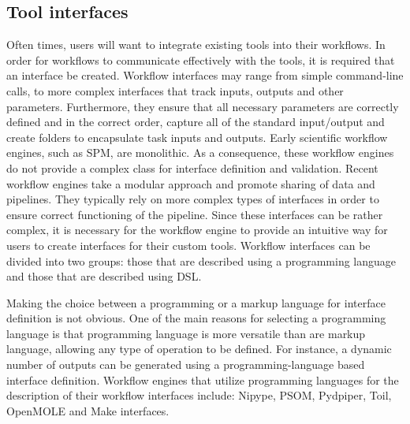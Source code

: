         \subsection{Tool interfaces}\label{mod}
            Often times, users will want to integrate existing tools into their 
            workflows. In order for workflows to communicate effectively with
            the tools, it is required that an interface be created. Workflow 
            interfaces may range from simple command-line calls, to more 
            complex interfaces that track inputs, outputs and other parameters. 
            Furthermore, they ensure
            that all necessary parameters are correctly defined and in the 
            correct order,  capture all of the 
            standard input/output and create folders to encapsulate task inputs
            and outputs. Early scientific workflow engines, such as SPM, are 
            monolithic. As a consequence, these workflow engines do not provide
            a complex class for interface definition and validation. Recent
            workflow engines take a modular approach and promote sharing of data
            and pipelines. They typically rely on more complex types 
            of interfaces in order to ensure correct functioning of the pipeline.
            Since these interfaces can be rather complex, it is necessary for the 
            workflow engine to provide an intuitive way for users to create 
            interfaces for their custom tools. Workflow interfaces can be 
            divided into two groups: those that are described using a 
            programming language and those that are described using DSL.

            Making the choice between a programming or a markup language for 
            interface definition is not obvious. One of the main reasons for 
            selecting a programming language is that programming language is 
            more versatile than are markup language, allowing any type of 
            operation to be defined. For instance, a dynamic number of outputs
            can be generated using a programming-language based interface 
            definition. Workflow engines that utilize programming 
            languages for the 
            description of their workflow interfaces include: Nipype, PSOM,
            Pydpiper, Toil, OpenMOLE and Make interfaces. 
          

